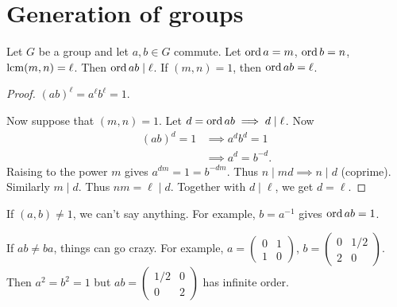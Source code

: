 
\section{Generation of groups} \label{sec:groups:gen}

\begin{lemma}
    Let $G$ be a group and let $a, b \in G$ commute.
    Let $\operatorname{ord} a = m$, $\operatorname{ord} b = n$, $\operatorname{lcm}(m, n) = \ell$.
    Then $\operatorname{ord} ab \mid \ell$.
    If $(m, n) = 1$, then $\operatorname{ord} ab = \ell$.
\end{lemma}
\begin{proof}
    $(ab)^\ell = a^\ell b^\ell = 1$.

    Now suppose that $(m, n) = 1$.
    Let $d = \operatorname{ord} ab \implies d \mid \ell$.
    Now \begin{align*}
        (ab)^d = 1 &\implies a^d b^d = 1 \\
        &\implies a^d = b^{-d}.
    \end{align*}
    Raising to the power $m$ gives $a^{dm} = 1 = b^{-dm}$.
    Thus $n \mid m d \implies n \mid d$ (coprime).
    Similarly $m \mid d$.
    Thus $nm = \ell \mid d$.
    Together with $d \mid \ell$, we get $d = \ell$.
\end{proof}

\begin{examples}
    \item If $(a, b) \ne 1$, we can't say anything.
        For example, $b = a^{-1}$ gives $\operatorname{ord} ab = 1$.
    \item If $ab \ne ba$, things can go crazy.
        For example, $a = \begin{pmatrix}
            0 & 1 \\
            1 & 0
        \end{pmatrix}$, $b = \begin{pmatrix}
            0 & 1 / 2 \\
            2 & 0
        \end{pmatrix}$.
        Then $a^2 = b^2 = 1$ but $ab = \begin{pmatrix}
            1 / 2 & 0 \\
            0 & 2
        \end{pmatrix}$ has infinite order.
\end{examples}

\begin{definition}[Presentation] \label{def:groups:presentation}
    
\end{definition}

